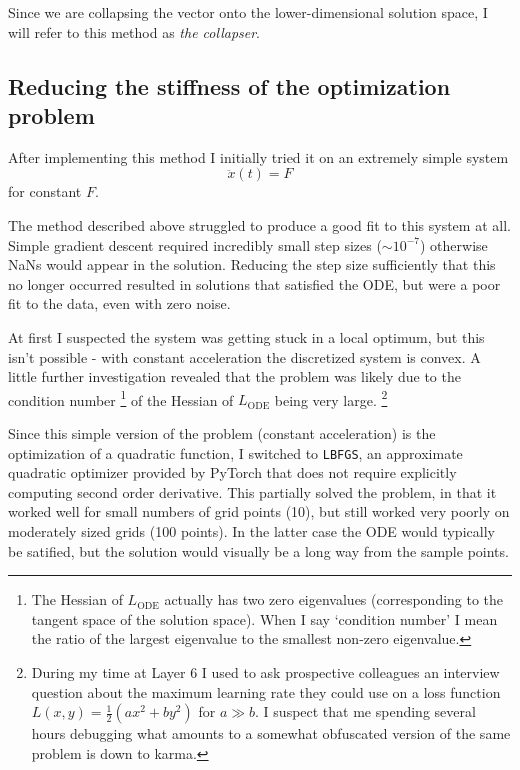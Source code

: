 \documentclass{article}
\begin{document}
Since we are collapsing the vector onto the lower-dimensional solution space, I will refer to this method as \emph{the collapser}.

\subsection{Reducing the stiffness of the optimization problem}

After implementing this method I initially tried it on an extremely simple system
$$
\ddot{x}(t) = F
$$
for constant $F$.

The method described above struggled to produce a good fit to this system at all.
Simple gradient descent required incredibly small step sizes ($\sim 10^{-7}$) otherwise NaNs would appear in the solution.
Reducing the step size sufficiently that this no longer occurred resulted in solutions that satisfied the ODE, but were a poor fit to the data, even with zero noise.

At first I suspected the system was getting stuck in a local optimum, but this isn't possible - with constant acceleration the discretized system is convex.
A little further investigation revealed that the problem was likely due to the condition number%
\footnote{
The Hessian of $L_{\mathrm{ODE}}$ actually has two zero eigenvalues (corresponding to the tangent space of the solution space). When I say `condition number' I mean the ratio of the largest eigenvalue to the smallest non-zero eigenvalue.
}
 of the Hessian of $L_{\mathrm{ODE}}$ being very large.%
\footnote{
During my time at Layer 6 I used to ask prospective colleagues an interview question about the maximum learning rate they could use on a loss function $L(x, y) = \frac{1}{2} \left( a x^2 + b y^2 \right)$ for $ a \gg b$.
I suspect that me spending several hours debugging what amounts to a somewhat obfuscated version of the same problem is down to karma.
}

Since this simple version of the problem (constant acceleration) is the optimization of a quadratic function, I switched to \texttt{LBFGS}, an approximate quadratic optimizer provided by PyTorch that does not require explicitly computing second order derivative.
This partially solved the problem, in that it worked well for small numbers of grid points (10), but still worked very poorly on moderately sized grids (100 points).
In the latter case the ODE would typically be satified, but the solution would visually be a long way from the sample points.
\end{document}
